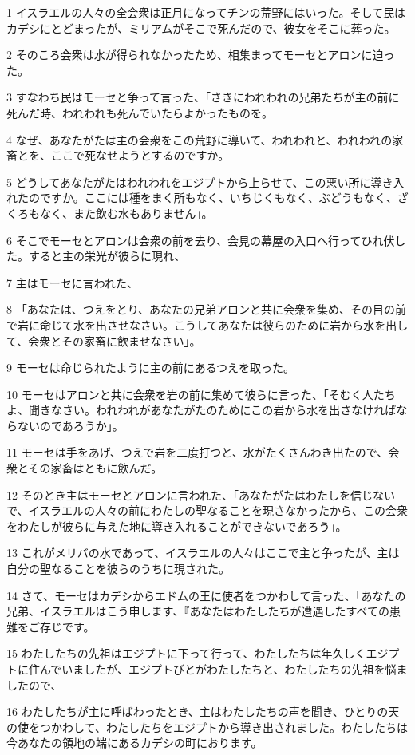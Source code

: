 \par 1 イスラエルの人々の全会衆は正月になってチンの荒野にはいった。そして民はカデシにとどまったが、ミリアムがそこで死んだので、彼女をそこに葬った。
\par 2 そのころ会衆は水が得られなかったため、相集まってモーセとアロンに迫った。
\par 3 すなわち民はモーセと争って言った、「さきにわれわれの兄弟たちが主の前に死んだ時、われわれも死んでいたらよかったものを。
\par 4 なぜ、あなたがたは主の会衆をこの荒野に導いて、われわれと、われわれの家畜とを、ここで死なせようとするのですか。
\par 5 どうしてあなたがたはわれわれをエジプトから上らせて、この悪い所に導き入れたのですか。ここには種をまく所もなく、いちじくもなく、ぶどうもなく、ざくろもなく、また飲む水もありません」。
\par 6 そこでモーセとアロンは会衆の前を去り、会見の幕屋の入口へ行ってひれ伏した。すると主の栄光が彼らに現れ、
\par 7 主はモーセに言われた、
\par 8 「あなたは、つえをとり、あなたの兄弟アロンと共に会衆を集め、その目の前で岩に命じて水を出させなさい。こうしてあなたは彼らのために岩から水を出して、会衆とその家畜に飲ませなさい」。
\par 9 モーセは命じられたように主の前にあるつえを取った。
\par 10 モーセはアロンと共に会衆を岩の前に集めて彼らに言った、「そむく人たちよ、聞きなさい。われわれがあなたがたのためにこの岩から水を出さなければならないのであろうか」。
\par 11 モーセは手をあげ、つえで岩を二度打つと、水がたくさんわき出たので、会衆とその家畜はともに飲んだ。
\par 12 そのとき主はモーセとアロンに言われた、「あなたがたはわたしを信じないで、イスラエルの人々の前にわたしの聖なることを現さなかったから、この会衆をわたしが彼らに与えた地に導き入れることができないであろう」。
\par 13 これがメリバの水であって、イスラエルの人々はここで主と争ったが、主は自分の聖なることを彼らのうちに現された。
\par 14 さて、モーセはカデシからエドムの王に使者をつかわして言った、「あなたの兄弟、イスラエルはこう申します、『あなたはわたしたちが遭遇したすべての患難をご存じです。
\par 15 わたしたちの先祖はエジプトに下って行って、わたしたちは年久しくエジプトに住んでいましたが、エジプトびとがわたしたちと、わたしたちの先祖を悩ましたので、
\par 16 わたしたちが主に呼ばわったとき、主はわたしたちの声を聞き、ひとりの天の使をつかわして、わたしたちをエジプトから導き出されました。わたしたちは今あなたの領地の端にあるカデシの町におります。
